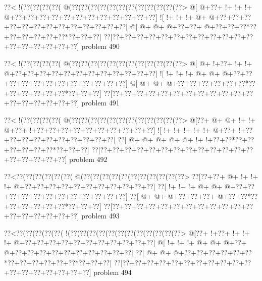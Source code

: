\vbox{\vbox{\goo
\0??<\- !(\0??(\0??(\0??(\0??(\- @(\0??(\0??(\0??(\0??(\0??(\0??(\0??(\0??(\0??(\0??(\0??(\0??>
\- @[\- @+\0??+\- !+\- !+\- !+\- @+\0??+\0??+\0??+\0??+\0??+\0??+\0??+\0??+\0??+\0??+\0??+\0??]
\- ![\- !+\- !+\- !+\- @+\- @+\0??+\0??+\0??+\0??+\0??+\0??+\0??+\0??+\0??+\0??+\0??+\0??+\0??]
\- @[\- @+\- @+\- @+\0??+\0??+\- @+\0??+\0??+\0??*\0??+\0??+\0??+\0??+\0??+\0??*\0??+\0??+\0??]
\0??[\0??+\0??+\0??+\0??+\0??+\0??+\0??+\0??+\0??+\0??+\0??+\0??+\0??+\0??+\0??+\0??+\0??+\0??]
}
\hfil problem 490\hfil\break
}



\vbox{\vbox{\goo
\0??<\- !(\0??(\0??(\0??(\0??(\- @(\0??(\0??(\0??(\0??(\0??(\0??(\0??(\0??(\0??(\0??(\0??(\0??>
\- @[\- @+\- !+\0??+\- !+\- !+\- @+\0??+\0??+\0??+\0??+\0??+\0??+\0??+\0??+\0??+\0??+\0??+\0??]
\- ![\- !+\- !+\- !+\- @+\- @+\- @+\0??+\0??+\0??+\0??+\0??+\0??+\0??+\0??+\0??+\0??+\0??+\0??]
\- @[\- @+\- @+\- @+\0??+\0??+\0??+\0??+\0??+\0??*\0??+\0??+\0??+\0??+\0??+\0??*\0??+\0??+\0??]
\0??[\0??+\0??+\0??+\0??+\0??+\0??+\0??+\0??+\0??+\0??+\0??+\0??+\0??+\0??+\0??+\0??+\0??+\0??]
}
\hfil problem 491\hfil\break
}



\vbox{\vbox{\goo
\0??<\- !(\0??(\0??(\0??(\0??(\- @(\0??(\0??(\0??(\0??(\0??(\0??(\0??(\0??(\0??(\0??(\0??(\0??>
\- @[\0??+\- @+\- @+\- !+\- !+\- @+\0??+\- !+\0??+\0??+\0??+\0??+\0??+\0??+\0??+\0??+\0??+\0??]
\- ![\- !+\- !+\- !+\- !+\- !+\- @+\0??+\- !+\0??+\0??+\0??+\0??+\0??+\0??+\0??+\0??+\0??+\0??]
\0??[\- @+\- @+\- @+\- @+\- @+\- !+\- !+\0??+\0??*\0??+\0??+\0??+\0??+\0??+\0??*\0??+\0??+\0??]
\0??[\0??+\0??+\0??+\0??+\0??+\0??+\0??+\0??+\0??+\0??+\0??+\0??+\0??+\0??+\0??+\0??+\0??+\0??]
}
\hfil problem 492\hfil\break
}



\vbox{\vbox{\goo
\0??<\0??(\0??(\0??(\0??(\0??(\0??(\- @(\0??(\0??(\0??(\0??(\0??(\0??(\0??(\0??(\0??(\0??(\0??>
\0??[\0??+\0??+\- @+\- !+\- !+\- !+\- @+\0??+\0??+\0??+\0??+\0??+\0??+\0??+\0??+\0??+\0??+\0??]
\0??[\- !+\- !+\- !+\- @+\- @+\- @+\0??+\0??+\0??+\0??+\0??+\0??+\0??+\0??+\0??+\0??+\0??+\0??]
\0??[\- @+\- @+\- @+\0??+\0??+\0??+\- @+\0??+\0??*\0??+\0??+\0??+\0??+\0??+\0??*\0??+\0??+\0??]
\0??[\0??+\0??+\0??+\0??+\0??+\0??+\0??+\0??+\0??+\0??+\0??+\0??+\0??+\0??+\0??+\0??+\0??+\0??]
}
\hfil problem 493\hfil\break
}



\vbox{\vbox{\goo
\0??<\0??(\0??(\0??(\0??(\0??(\- !(\0??(\0??(\0??(\0??(\0??(\0??(\0??(\0??(\0??(\0??(\0??(\0??>
\- @[\0??+\- !+\0??+\- !+\- !+\- !+\- @+\0??+\0??+\0??+\0??+\0??+\0??+\0??+\0??+\0??+\0??+\0??]
\- @[\- !+\- !+\- !+\- @+\- @+\- @+\0??+\- @+\0??+\0??+\0??+\0??+\0??+\0??+\0??+\0??+\0??+\0??]
\0??[\- @+\- @+\- @+\0??+\0??+\0??+\0??+\0??+\0??*\0??+\0??+\0??+\0??+\0??+\0??*\0??+\0??+\0??]
\0??[\0??+\0??+\0??+\0??+\0??+\0??+\0??+\0??+\0??+\0??+\0??+\0??+\0??+\0??+\0??+\0??+\0??+\0??]
}
\hfil problem 494\hfil\break
}



